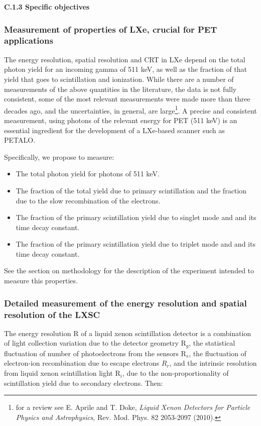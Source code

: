 \noindent\textbf{C.1.3 Specific objectives}

\subsubsection*{Measurement of properties of LXe, crucial  for PET applications}
The energy resolution, spatial resolution and CRT in LXe depend on the total photon yield for an incoming gamma of 511 keV, as well as the fraction of that yield that goes to scintillation and ionization. While there are a number of measurements of the above quantities in the literature, the  data is not fully consistent, some of the most relevant measurements were made more than three decades ago, and the uncertainties, in general, are large\footnote{for a review see E. Aprile and T. Doke, {\em Liquid Xenon Detectors for Particle Physics and Astrophysics}, Rev. Mod. Phys. 82 2053-2097 (2010).}. A precise and consistent measurement, using photons of the relevant energy for PET (511 keV) is an essential ingredient for the development of a LXe-based scanner such as PETALO. 

Specifically, we propose to measure:
\begin{itemize}
\item The total photon yield for photons of 511 keV.
\item The fraction of the total yield due to primary scintillation and the fraction due  to the slow recombination of the electrons.
\item The fraction of the primary scintillation yield due to singlet mode and and its time decay constant.
\item The fraction of the primary scintillation yield due to triplet mode and and its time decay constant.
\end{itemize}

See the section on methodology for the description of the experiment intended to measure this properties. 

\subsubsection*{Detailed measurement of the energy resolution and spatial resolution of the LXSC}

The energy resolution R of a liquid xenon scintillation detector is a combination of light collection variation due to the detector geometry R$_g$, the statistical fluctuation of number of photoelectrons from the sensors R$_s$, the fluctuation of electron-ion recombination due to escape electrons $R_r$, and the intrinsic resolution from liquid xenon scintillation light R$_i$, due to the non-proportionality of scintillation yield due to secondary electrons. Then:

